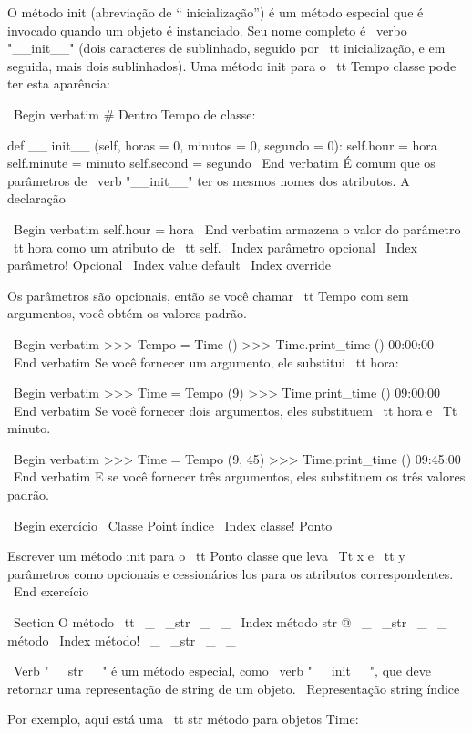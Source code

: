 \documentclass[10pt]{book}
\begin{document}
\begin {itemize}
{{{{{{{{{{{{{{O método init (abreviação de `` inicialização'') é
um método especial que é invocado quando um objeto é instanciado.  
Seu nome completo é \ verbo "__init__" (dois caracteres de sublinhado,
seguido por {\ tt inicialização}, e em seguida, mais dois sublinhados). Uma
método init para o {\ tt} Tempo classe pode ter esta aparência:

\ Begin {verbatim}
# Dentro Tempo de classe:

    def __ init__ (self, horas = 0, minutos = 0, segundo = 0):
        self.hour = hora
        self.minute = minuto
        self.second = segundo
\ End {verbatim}
%
É comum que os parâmetros de \ verb "__init__"
ter os mesmos nomes dos atributos. A declaração

\ Begin {verbatim}
        self.hour = hora
\ End {verbatim}
%
armazena o valor do parâmetro {\ tt hora} como um atributo
de {\ tt self}.
\ Index {parâmetro opcional}
\ Index {parâmetro! Opcional}
\ Index {value default}
\ Index {override}

Os parâmetros são opcionais, então se você chamar {\ tt Tempo} com
sem argumentos, você obtém os valores padrão.

\ Begin {verbatim}
>>> Tempo = Time ()
>>> Time.print_time ()
00:00:00
\ End {verbatim}
%
Se você fornecer um argumento, ele substitui {\ tt hora}:

\ Begin {verbatim}
>>> Time = Tempo (9)
>>> Time.print_time ()
09:00:00
\ End {verbatim}
%
Se você fornecer dois argumentos, eles substituem {\ tt hora} e
{\ Tt minuto}.

\ Begin {verbatim}
>>> Time = Tempo (9, 45)
>>> Time.print_time ()
09:45:00
\ End {verbatim}
%
E se você fornecer três argumentos, eles substituem os três
valores padrão.


\ Begin {} exercício
\ {Classe Point} índice
\ Index {classe! Ponto}

Escrever um método init para o {\ tt Ponto} classe que leva
{\ Tt x} e {\ tt y} parâmetros como opcionais e cessionários
los para os atributos correspondentes.
\ End {} exercício


\ Section {O método {\ tt \ _ \ _str \ _ \ _}}
\ Index {método str @ \ _ \ _str \ _ \ _ método}
\ Index {método! \ _ \ _str \ _ \ _}

\ Verb "__str__" é um método especial, como \ verb "__init__",
que deve retornar uma representação de string de um objeto.
\ {Representação string} índice

Por exemplo, aqui está uma {\ tt str} método para objetos Time:

}}}}}}}}}}}}}}
\end{itemize}
\end{document}
